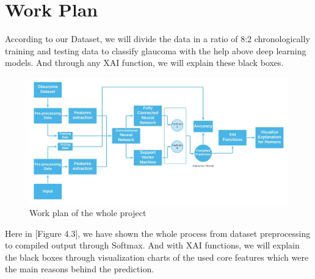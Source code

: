 \newpage
\section{Work Plan} 
According to our Dataset, we will divide the data in a ratio of 8:2 chronologically training and testing data to classify glaucoma with the help above deep learning models. And through any XAI function, we will explain these black boxes.

\begin{figure}[htbp]
\centering
\includegraphics[scale=0.75]{images/fig-3.png}
\caption{Work plan of the whole project}
\label{fig:x Work plan of the whole project}
\end{figure}

\vspace{5mm}
\noindent Here in [Figure 4.3], we have shown the whole process from dataset preprocessing to compiled output through Softmax. And with XAI functions, we will explain the black boxes through visualization charts of the used core features which were the main reasons behind the prediction.